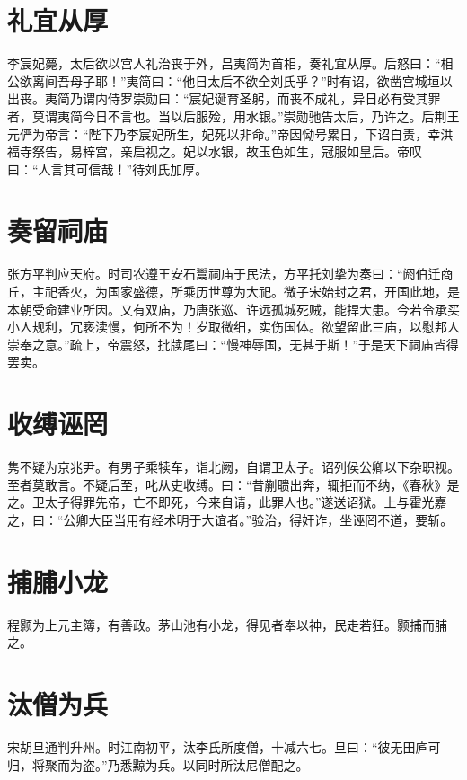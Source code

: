 \documentclass[a4paper,12pt,UTF8,twoside]{ctexbook}
\begin{document}
    \section{礼宜从厚}
    
    李宸妃薨，太后欲以宫人礼治丧于外，吕夷简为首相，奏礼宜从厚。后怒曰：“相公欲离间吾母子耶！”夷简曰：“他日太后不欲全刘氏乎？”时有诏，欲凿宫城垣以出丧。夷简乃谓内侍罗崇勋曰：“宸妃诞育圣躬，而丧不成礼，异日必有受其罪者，莫谓夷简今日不言也。当以后服殓，用水银。”崇勋驰告太后，乃许之。后荆王元俨为帝言：“陛下乃李宸妃所生，妃死以非命。”帝因恸号累日，下诏自责，幸洪福寺祭告，易梓宫，亲启视之。妃以水银，故玉色如生，冠服如皇后。帝叹曰：“人言其可信哉！”待刘氏加厚。
    
    \section{奏留祠庙}
    
    张方平判应天府。时司农遵王安石鬻祠庙于民法，方平托刘挚为奏曰：“阏伯迁商丘，主祀香火，为国家盛德，所乘历世尊为大祀。微子宋始封之君，开国此地，是本朝受命建业所因。又有双庙，乃唐张巡、许远孤城死贼，能捍大患。今若令承买小人规利，冗亵渎慢，何所不为！岁取微细，实伤国体。欲望留此三庙，以慰邦人崇奉之意。”疏上，帝震怒，批牍尾曰：“慢神辱国，无甚于斯！”于是天下祠庙皆得罢卖。
    
    \section{收缚诬罔}
    
    隽不疑为京兆尹。有男子乘犊车，诣北阙，自谓卫太子。诏列侯公卿以下杂职视。至者莫敢言。不疑后至，叱从吏收缚。曰：“昔蒯聩出奔，辄拒而不纳，《春秋》是之。卫太子得罪先帝，亡不即死，今来自请，此罪人也。”遂送诏狱。上与霍光嘉之，曰：“公卿大臣当用有经术明于大谊者。”验治，得奸诈，坐诬罔不道，要斩。
    
    \section{捕脯小龙}
    
    程颢为上元主簿，有善政。茅山池有小龙，得见者奉以神，民走若狂。颢捕而脯之。
    
    \section{汰僧为兵}
    
    宋胡旦通判升州。时江南初平，汰李氏所度僧，十减六七。旦曰：“彼无田庐可归，将聚而为盗。”乃悉黥为兵。以同时所汰尼僧配之。
    
\end{document}
